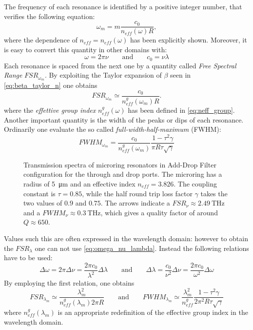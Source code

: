 The frequency of each resonance is identified by a positive integer number, that verifies the following equation:
\begin{equation}
	\omega_m = m\dfrac{c_0}{n_{eff}(\omega)R},
\end{equation}
where the dependence of $n_{eff}=n_{eff}\left(\omega\right)$ has been explicitly shown.
Moreover, it is easy to convert this quantity in other domains with:
\begin{equation}
	\omega = 2\pi\nu \qquad \mathrm{and} \qquad c_0 = \nu\lambda
	\label{eq:omega_nu_lambda}
\end{equation}
Each resonance is spaced from the next one by a quantity called \textit{Free Spectral Range} $FSR_{\omega_m}$.
By exploiting the Taylor expansion of $\beta$ seen in \cref{eq:beta_taylor_n} one obtains
\begin{equation}
	FSR_{\omega_m} \simeq \dfrac{c_0}{n_{eff}^g\left(\omega_m\right) R} .
\end{equation}
where the \textit{effettive group index} $n_{eff}^g\left(\omega\right)$ has been defined in \cref{eq:neff_group}.
Another important quantity is the width of the peaks or dips of each resonance.
Ordinarily one evaluate the so called \textit{full-width-half-maximum} (FWHM):
\begin{equation}
	FWHM_{\omega_m} = \dfrac{c_0}{n_{eff}^g\left(\omega_m\right)}\dfrac{1- \tau^2\gamma}{\pi R \tau \sqrt{\gamma}}
\end{equation}

\begin{figure}[!hbtp]
	\centering
	
	\caption{Transmission spectra of microring resonators in Add-Drop Filter configuration for the through and drop ports.
	The microring has a radius of \SI{5}{\um} and an effective index $n_{eff}=3.826$.
	The coupling constant is $\tau=0.85$, while the half round trip loss factor $\gamma$ takes the two values of $0.9$ and $0.75$.
	The arrows indicate a $FSR_\nu \approx \SI{2.49}{\THz}$ and a $FWHM_\nu \approx \SI{0.3}{\THz}$, which gives a quality factor of around $Q \approx \num{650}$.
	}
	\label{fig:ADF2}
\end{figure}

Values such this are often expressed in the wavelength domain: however to obtain the $FSR_\lambda$ one can not use \cref{eq:omega_nu_lambda}.
Instead the following relations have to be used:
\begin{equation}
	\Delta\omega = 2\pi \Delta \nu = \dfrac{2\pi c_0}{\lambda^2}\Delta\lambda
		\qquad \mathrm{and} \qquad
	\Delta\lambda = \dfrac{c_0}{\nu^2}\Delta\nu = \dfrac{2\pi c_0}{\omega^2}\Delta\omega
\end{equation}
By employing the first relation, one obtains
\begin{equation}
	FSR_{\lambda_m} \simeq \dfrac{\lambda_m^2}{n_{eff}^g\left(\lambda_m\right) 2\pi R}
		\qquad \mathrm{and} \qquad
	FWHM_{\lambda_m} \simeq	\dfrac{\lambda_m^2}{n_{eff}^g}
													\dfrac{1- \tau^2\gamma}{2\pi^2 R \tau \sqrt{\gamma}}
\end{equation}
where $n_{eff}^g\left(\lambda_m\right)$ is an appropriate redefinition of the effective group index in the wavelength domain.

